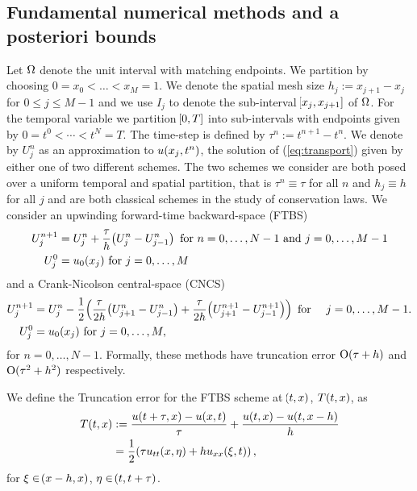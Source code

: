 \documentclass[final]{amsart}
\numberwithin{equation}{section}
\begin{document}
\subsection{Fundamental numerical methods and a posteriori bounds}\label{sec:example_aposteriori_bounds}

Let $\Omega$ denote the unit interval with matching endpoints. We
partition by choosing $0=x_0< \dots < x_{M}=1$. We denote the spatial
mesh size $ h_j := x_{j+1} - x_{j}$ for $0\leq j\leq M-1$ and we use
$I_j$ to denote the sub-interval $\!\left[{x_{j},x_{j+1}}\right]$ of $\Omega$. For the
temporal variable we partition $\!\left[{0,T}\right]$ into sub-intervals with
endpoints given by $0=t^0<\cdots<t^N=T$.  The time-step is defined by
$\tau^n:=t^{n+1}-t^n$. We denote by $U^n_j$ as an approximation to $
u\!\left({x_j, t^n}\right)$, the solution of (\ref{eq:transport}) given by either
one of two different schemes. The two schemes we consider are both
posed over a uniform temporal and spatial partition, that is $\tau^n
\equiv \tau$ for all $n$ and $h_j\equiv h$ for all $j$ and are both
classical schemes in the study of conservation laws. We consider an
upwinding forward-time backward-space (FTBS)
\begin{equation}
\label{eq:FTBS}
\begin{split}
U^{n+1}_j &= U^n_j + \frac{\tau}{h} \!\left({U^n_{j} - U^n_{j-1}}\right)
\text{ for } n=0,\dots, N-1 \text{ and } j=0,\dots, M-1
\\
U^0_j &= u_0(x_j) \text{ for } j=0, \dots, M
\end{split}
\end{equation}
and a Crank-Nicolson central-space (CNCS)
\begin{equation}
\label{eq:FTCS}
\begin{split}
U^{n+1}_j &= U^n_j - \frac{1}{2}\!\left({\frac{\tau}{2h}
	\!\left({U^n_{j+1}-U^n_{j-1}}\right) 
	+
	\frac{\tau}{2h}\!\left({U^{n+1}_{j+1}-U^{n+1}_{j-1}}\right)}\right)
\text{ for } \quad j=0,\dots, M-1.
\\
U^0_j &= u_0(x_j) \text{ for } j=0, \dots, M,
\end{split}
\end{equation}
for $n=0,\dots,N-1$.
Formally, these methods have truncation error $\operatorname{O}(\tau + h)$ and
$\operatorname{O}(\tau^2 + h^2)$ respectively.

\begin{Defn}\label{defn:truncation_ftbs}
	We define the Truncation error for the FTBS scheme at $\!\left({t,x}\right)$, $T\!\left({t,x}\right)$, as
	\begin{equation}
	\begin{aligned}
	T\qp{t,x}&:=\frac{u\qp{t+\tau,x}-u\qp{x,t}}{\tau}+\frac{u\qp{t,x}-u\qp{t,x-h}}{h}\\
	&=\frac{1}{2}\qp{ \tau u_{tt}\qp{x,\eta} +hu_{xx}\qp{\xi,t} },
	\end{aligned}
	\end{equation}
	for $\xi\in\!\left({x-h,x}\right)$, $\eta \in\!\left({t, t+\tau}\right)$.
\end{Defn}
\end{document}

